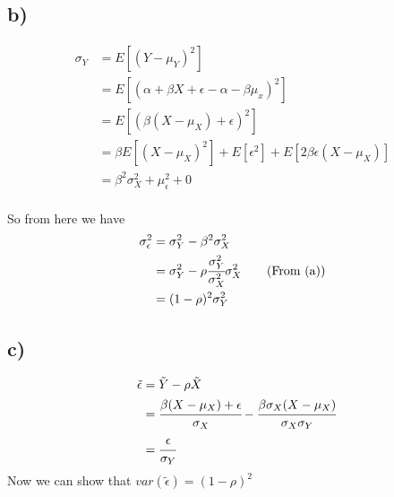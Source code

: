 \documentclass[11pt]{article}
\begin{document}
\subsection*{b)}
\label{sec:org3569c5e}
\begin{align*}

  \sigma_{Y} &= E \left[ (Y - \mu_{Y})^{2} \right]\\

  \quad &= E \left[ (\alpha + \beta X + \epsilon - \alpha - \beta \mu_{x} )^{2} \right] \tag{by Eq. (1)}\\

  \quad &= E \left[ (\beta (X - \mu_{X} ) + \epsilon)^{2} \right]\\

  \quad &= \beta E \left[ (X - \mu_{X})^{2} \right] + E \left[ \epsilon^{2} \right] + E \left[ 2 \beta \epsilon (X - \mu_{X} )\right]\\

  \quad &= \beta^{2} \sigma^{2}_{X} + \mu^{2}_{\epsilon} + 0\\

\end{align*}

So from here we have
\begin{align*}

  \sigma^{2}_{\epsilon} &= \sigma^{2}_{Y} - \beta^{2} \sigma^{2}_{X}\\

  \quad &= \sigma^{2}_{Y} - \rho \cfrac{\sigma^{2}_{Y}}{\sigma^{2}_{X}} \sigma^{2}_{X} \tag{From (a)}\\

  \quad &= (1 - \rho)^{2}\sigma^{2}_{Y}
\end{align*}

\subsection*{c)}
\label{sec:org2699f03}
\begin{align*}
  \tilde{\epsilon} &= \tilde{Y} - \rho \tilde{X}\\
  \quad &= \cfrac{\beta (X - \mu_{X}) + \epsilon}{\sigma_{X}} - \cfrac{\beta \sigma_{X} (X - \mu_{X})}{\sigma_{X}\sigma_{Y}}\\
  \quad &= \cfrac{\epsilon}{\sigma_{Y}}
\end{align*}
Now we can show that $var(\tilde{\epsilon}) = (1 - \rho)^{2}$
\end{document}
